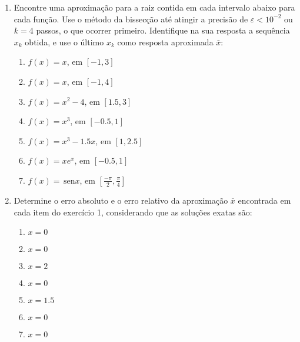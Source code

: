 \documentclass[a4paper]{article}
\providecommand{\sin}{} \renewcommand{\sin}{\hspace{2pt}\mathrm{sen}}
\begin{document}
\begin{enumerate}
\item Encontre uma aproximação para a raiz contida em cada intervalo
  abaixo para cada função. Use o método da bissecção até atingir a
  precisão de $\varepsilon<10^{-2}$ ou $k=4$ passos, o que ocorrer
  primeiro. Identifique na sua resposta a sequência $x_k$ obtida, e
  use o último $x_k$ como resposta aproximada $\bar{x}$:

  \begin{enumerate}
  \item $f(x) = x$, em $[-1, 3]$
  \item $f(x) = x$, em $[-1, 4]$
  \item $f(x) = x^2 - 4$, em $[1.5, 3]$
  \item $f(x) = x^3$, em $[-0.5, 1]$
  \item $f(x) = x^3-1.5x$, em $[1, 2.5]$
  \item $f(x) = x e^x$, em $[-0.5, 1]$
  \item $f(x) = \sin x$, em
    $\left[\frac{-\pi}{2},\frac{\pi}{4}\right]$
  \end{enumerate}

\item Determine o erro absoluto e o erro relativo da aproximação
  $\bar{x}$ encontrada em cada item do exercício 1, considerando que
  as soluções exatas são:
  \begin{enumerate}
  \item $x=0$ %
  \item $x=0$ %
  \item $x=2$ %
  \item $x=0$ %
  \item $x=1.5$ %
  \item $x=0$ %
  \item $x=0$ %
  \end{enumerate}



\end{enumerate}
\end{document}
